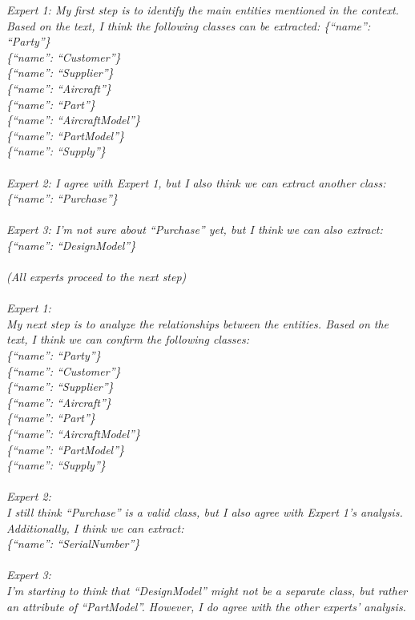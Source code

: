 \noindent{}\textit{Expert 1:
My first step is to identify the main entities mentioned in the context. Based on the text, I think the following classes can be extracted:
\{``name'': ``Party''\} \\
\{``name'': ``Customer''\} \\
\{``name'': ``Supplier''\} \\
\{``name'': ``Aircraft''\} \\
\{``name'': ``Part''\} \\
\{``name'': ``AircraftModel''\} \\
\{``name'': ``PartModel''\} \\
\{``name'': ``Supply''\} \\~\\
Expert 2:
I agree with Expert 1, but I also think we can extract another class:
\{``name'': ``Purchase''\} \\~\\
Expert 3:
I'm not sure about ``Purchase'' yet, but I think we can also extract:
\{``name'': ``DesignModel''\} \\~\\
(All experts proceed to the next step) \\~\\
Expert 1: \\
My next step is to analyze the relationships between the entities. Based on the text, I think we can confirm the following classes: \\
\{``name'': ``Party''\} \\
\{``name'': ``Customer''\} \\
\{``name'': ``Supplier''\} \\
\{``name'': ``Aircraft''\} \\
\{``name'': ``Part''\} \\
\{``name'': ``AircraftModel''\} \\
\{``name'': ``PartModel''\} \\
\{``name'': ``Supply''\} \\~\\
Expert 2: \\
I still think ``Purchase'' is a valid class, but I also agree with Expert 1's analysis. Additionally, I think we can extract: \\
\{``name'': ``SerialNumber''\} \\~\\
Expert 3: \\
I'm starting to think that ``DesignModel'' might not be a separate class, but rather an attribute of ``PartModel''. However, I do agree with the other experts' analysis. \\~\\
}
